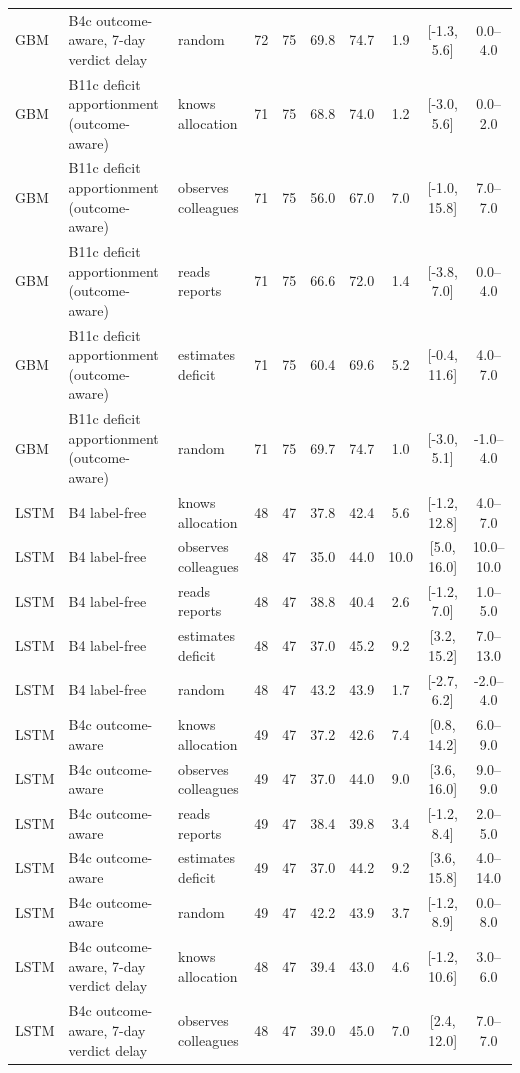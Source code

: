\documentclass[10pt,onecolumn,letterpaper]{article}
\begin{document}
\begin{table}[!t]
\begin{tabular}{lllccccccc}
GBM & B4c outcome-aware, 7-day verdict delay & random & 72 & 75 & 69.8 & 74.7 & 1.9 & [-1.3, 5.6] & 0.0--4.0 \\
GBM & B11c deficit apportionment (outcome-aware) & knows allocation & 71 & 75 & 68.8 & 74.0 & 1.2 & [-3.0, 5.6] & 0.0--2.0 \\
GBM & B11c deficit apportionment (outcome-aware) & observes colleagues & 71 & 75 & 56.0 & 67.0 & 7.0 & [-1.0, 15.8] & 7.0--7.0 \\
GBM & B11c deficit apportionment (outcome-aware) & reads reports & 71 & 75 & 66.6 & 72.0 & 1.4 & [-3.8, 7.0] & 0.0--4.0 \\
GBM & B11c deficit apportionment (outcome-aware) & estimates deficit & 71 & 75 & 60.4 & 69.6 & 5.2 & [-0.4, 11.6] & 4.0--7.0 \\
GBM & B11c deficit apportionment (outcome-aware) & random & 71 & 75 & 69.7 & 74.7 & 1.0 & [-3.0, 5.1] & -1.0--4.0 \\
LSTM & B4 label-free & knows allocation & 48 & 47 & 37.8 & 42.4 & 5.6 & [-1.2, 12.8] & 4.0--7.0 \\
LSTM & B4 label-free & observes colleagues & 48 & 47 & 35.0 & 44.0 & 10.0 & [5.0, 16.0] & 10.0--10.0 \\
LSTM & B4 label-free & reads reports & 48 & 47 & 38.8 & 40.4 & 2.6 & [-1.2, 7.0] & 1.0--5.0 \\
LSTM & B4 label-free & estimates deficit & 48 & 47 & 37.0 & 45.2 & 9.2 & [3.2, 15.2] & 7.0--13.0 \\
LSTM & B4 label-free & random & 48 & 47 & 43.2 & 43.9 & 1.7 & [-2.7, 6.2] & -2.0--4.0 \\
LSTM & B4c outcome-aware & knows allocation & 49 & 47 & 37.2 & 42.6 & 7.4 & [0.8, 14.2] & 6.0--9.0 \\
LSTM & B4c outcome-aware & observes colleagues & 49 & 47 & 37.0 & 44.0 & 9.0 & [3.6, 16.0] & 9.0--9.0 \\
LSTM & B4c outcome-aware & reads reports & 49 & 47 & 38.4 & 39.8 & 3.4 & [-1.2, 8.4] & 2.0--5.0 \\
LSTM & B4c outcome-aware & estimates deficit & 49 & 47 & 37.0 & 44.2 & 9.2 & [3.6, 15.8] & 4.0--14.0 \\
LSTM & B4c outcome-aware & random & 49 & 47 & 42.2 & 43.9 & 3.7 & [-1.2, 8.9] & 0.0--8.0 \\
LSTM & B4c outcome-aware, 7-day verdict delay & knows allocation & 48 & 47 & 39.4 & 43.0 & 4.6 & [-1.2, 10.6] & 3.0--6.0 \\
LSTM & B4c outcome-aware, 7-day verdict delay & observes colleagues & 48 & 47 & 39.0 & 45.0 & 7.0 & [2.4, 12.0] & 7.0--7.0 \\

\end{tabular}
\end{table}
\end{document}
